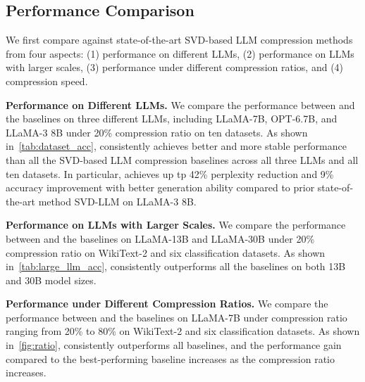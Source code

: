 \subsection{Performance Comparison}
\label{subsec:overall_performance}
We first compare \sysname against state-of-the-art SVD-based LLM compression methods from four aspects: (1) performance on different LLMs, (2) performance on LLMs with larger scales, (3) performance under different compression ratios, and (4) compression speed.

\vspace{1mm}
\noindent\textbf{Performance on Different LLMs.} 
We compare the performance between \sysname and the baselines on three different LLMs, including LLaMA-7B, OPT-6.7B, and LLaMA-3 8B  under 20\% compression ratio on ten datasets. As shown in~\cref{tab:dataset_acc},  \sysname consistently achieves better and more stable performance than all the SVD-based LLM compression baselines across all three LLMs and all ten datasets. 
%
In particular, \sysname achieves up tp 42\% perplexity reduction and 9\% accuracy
improvement with better generation ability compared to prior state-of-the-art method SVD-LLM on LLaMA-3 8B.

\vspace{1mm}
\noindent\textbf{Performance on LLMs with Larger Scales.} 
We compare the performance between \sysname and the baselines on LLaMA-13B and LLaMA-30B under 20\% compression ratio on WikiText-2 and six classification datasets. As shown in~\cref{tab:large_llm_acc}, \sysname consistently outperforms all the baselines on both 13B and 30B model sizes. 


\largellmaccuracyTable

\vspace{1mm}
\noindent\textbf{Performance under Different Compression Ratios.}
We compare the performance between \sysname and the baselines on LLaMA-7B under compression ratio ranging from 20\% to 80\% on WikiText-2 and six classification datasets. As shown in~\cref{fig:ratio}, \sysname consistently outperforms all baselines, and the performance gain compared to the best-performing baseline increases as the compression ratio increases. 

